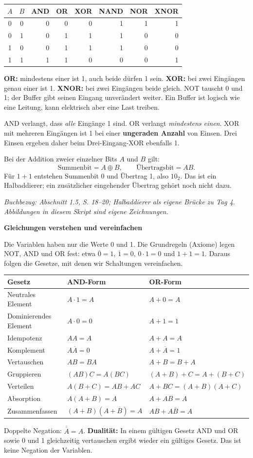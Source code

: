 \documentclass[10pt,a4paper]{article}
\newcommand{\titlepagepart}[2]{\vspace*{-4mm}{\sffamily\small #1}\par{\sffamily\LARGE\bfseries #2}\par\vspace{2mm}}
\newcommand{\block}[1]{\par\vspace{2mm}{\sffamily\large\bfseries #1}\par}
\newcommand{\source}[1]{\par{\footnotesize\itshape Buchbezug: #1. Abbildungen in diesem Skript sind eigene Zeichnungen.}}
\begin{document}
\block{Die vollständige Tabelle für zwei Eingänge}
\begin{center}
\begin{tabular}{cc|rrrrrr}\toprule
$A$&$B$&AND&OR&XOR&NAND&NOR&XNOR\\\midrule
0&0&0&0&0&1&1&1\\
0&1&0&1&1&1&0&0\\
1&0&0&1&1&1&0&0\\
1&1&1&1&0&0&0&1\\\bottomrule
\end{tabular}
\end{center}
\textbf{OR:} mindestens einer ist 1, auch beide dürfen 1 sein.
\textbf{XOR:} bei zwei Eingängen genau einer ist 1.
\textbf{XNOR:} bei zwei Eingängen beide gleich.
NOT tauscht 0 und 1; der Buffer gibt seinen Eingang unverändert weiter.
Ein Buffer ist logisch wie eine Leitung, kann elektrisch aber eine Last treiben.

\block{Mehr als zwei Eingänge}
AND verlangt, dass \emph{alle} Eingänge 1 sind. OR verlangt \emph{mindestens einen}.
XOR mit mehreren Eingängen ist 1 bei einer \textbf{ungeraden Anzahl} von Einsen.
Drei Einsen ergeben daher beim Drei-Eingang-XOR ebenfalls 1.

\block{Verbindung zu Tag 4}
Bei der Addition zweier einzelner Bits $A$ und $B$ gilt:
\[\text{Summenbit}=A\oplus B,\qquad\text{Übertragsbit}=AB.\]
Für $1+1$ entstehen Summenbit 0 und Übertrag 1, also $10_2$.
Das ist ein Halbaddierer; ein zusätzlicher eingehender Übertrag gehört noch nicht dazu.
\source{Abschnitt 1.5, S. 18--20; Halbaddierer als eigene Brücke zu Tag 4}

\newpage
\titlepagepart{03 / BOOLESCHE ALGEBRA}{Gleichungen verstehen und vereinfachen}
Die Variablen haben nur die Werte 0 und 1. Die Grundregeln (Axiome) legen NOT,
AND und OR fest: etwa $\overline0=1$, $\overline1=0$, $0\cdot1=0$ und $1+1=1$.
Daraus folgen die Gesetze, mit denen wir Schaltungen vereinfachen.
\begin{center}
\begin{tabular}{lll}\toprule
Gesetz&AND-Form&OR-Form\\\midrule
Neutrales Element&$A\cdot1=A$&$A+0=A$\\
Dominierendes Element&$A\cdot0=0$&$A+1=1$\\
Idempotenz&$AA=A$&$A+A=A$\\
Komplement&$A\overline A=0$&$A+\overline A=1$\\
Vertauschen&$AB=BA$&$A+B=B+A$\\
Gruppieren&$(AB)C=A(BC)$&$(A+B)+C=A+(B+C)$\\
Verteilen&$A(B+C)=AB+AC$&$A+BC=(A+B)(A+C)$\\
Absorption&$A(A+B)=A$&$A+AB=A$\\
Zusammenfassen&$(A+B)(A+\overline B)=A$&$AB+A\overline B=A$\\\bottomrule
\end{tabular}
\end{center}
Doppelte Negation: $\overline{\overline A}=A$.
\textbf{Dualität:} In einem gültigen Gesetz AND und OR sowie 0 und 1 gleichzeitig
vertauschen ergibt wieder ein gültiges Gesetz. Das ist keine Negation der Variablen.
\end{document}
